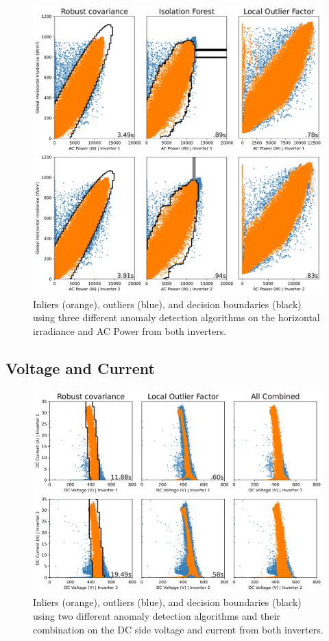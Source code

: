 \begin{figure}[h!]
    \centering
    \includegraphics[width=\textwidth]{figures/appendix/b_analysis/22_cleaning_horizontal_irrad-1.png}
    \caption{Inliers (orange), outliers (blue), and decision boundaries (black) using three different anomaly detection algorithms on the horizontal irradiance and AC Power from both inverters.}
    \label{fig:clean_horizontal_irrad}
\end{figure}

\subsection{Voltage and Current}

\begin{figure}[h!]
    \centering
    \includegraphics[width=\textwidth]{figures/appendix/b_analysis/23_cleaning_volt_curr-1.png}
    \caption{Inliers (orange), outliers (blue), and decision boundaries (black) using two different anomaly detection algorithms and their combination on the DC side voltage and current from both inverters.}
    \label{fig:clean_volt_curr}
\end{figure}

